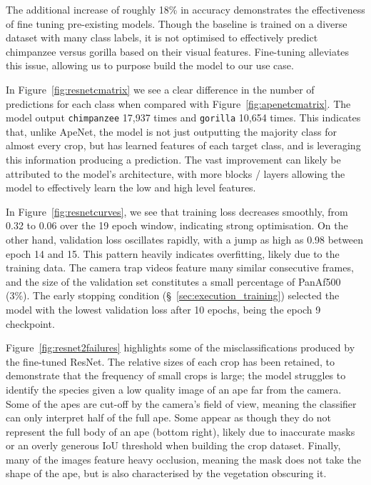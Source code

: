 \documentclass[author={Jacob Stephenson},
    degree={BSc},
    title={Robust Great Ape Species Detection in Wild Camera Trap Imagery with Promptable Concept Segmentation},
    unit={COMS30045},
    subtitle={}]{dissertation}
\begin{document}
The additional increase of roughly 18\% in accuracy demonstrates the effectiveness of fine tuning pre-existing models. Though the baseline is trained on a diverse dataset with many class labels, it is not optimised to effectively predict chimpanzee versus gorilla based on their visual features. Fine-tuning alleviates this issue, allowing us to purpose build the model to our use case.


In Figure~\ref{fig:resnetcmatrix} we see a clear difference in the number of predictions for each class when compared with Figure~\ref{fig:apenetcmatrix}. The model output \texttt{chimpanzee} 17,937 times and \texttt{gorilla} 10,654 times. This indicates that, unlike ApeNet, the model is not just outputting the majority class for almost every crop, but has learned features of each target class, and is leveraging this information producing a prediction. The vast improvement can likely be attributed to the model's architecture, with more blocks / layers allowing the model to effectively learn the low and high level features.

In Figure~\ref{fig:resnetcurves}, we see that training loss decreases smoothly, from 0.32 to 0.06 over the 19 epoch window, indicating strong optimisation. On the other hand, validation loss oscillates rapidly, with a jump as high as 0.98 between epoch 14 and 15. This pattern heavily indicates overfitting, likely due to the training data. The camera trap videos feature many similar consecutive frames, and the size of the validation set constitutes a small percentage of PanAf500 (3\%). The early stopping condition (\S~\ref{sec:execution_training}) selected the model with the lowest validation loss after 10 epochs, being the epoch 9 checkpoint.

Figure~\ref{fig:resnet2failures} highlights some of the misclassifications produced by the fine-tuned ResNet. The relative sizes of each crop has been retained, to demonstrate that the frequency of small crops is large; the model struggles to identify the species given a low quality image of an ape far from the camera. Some of the apes are cut-off by the camera's field of view, meaning the classifier can only interpret half of the full ape. Some appear as though they do not represent the full body of an ape (bottom right), likely due to inaccurate masks or an overly generous IoU threshold when building the crop dataset. Finally, many of the images feature heavy occlusion, meaning the mask does not take the shape of the ape, but is also characterised by the vegetation obscuring it.
\end{document}
